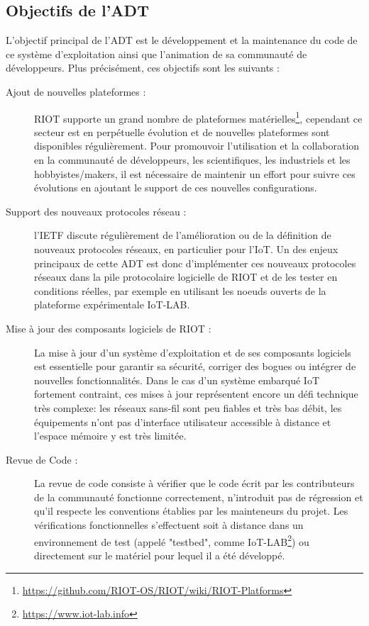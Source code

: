\documentclass[a4paper, twoside]{article}
\begin{document}
\subsection{Objectifs de l'ADT}

L'objectif principal de l'ADT est le développement et la maintenance du code de
ce système d'exploitation ainsi que l'animation de sa communauté de
développeurs.
Plus précisément, ces objectifs sont les suivants :
\begin{description}
    \item[Ajout de nouvelles plateformes :] RIOT supporte un grand nombre de
        plateformes
        matérielles\footnote{\url{https://github.com/RIOT-OS/RIOT/wiki/RIOT-Platforms}},
        cependant ce secteur est en perpétuelle évolution et de nouvelles plateformes
        sont disponibles régulièrement. Pour promouvoir l'utilisation et la 
        collaboration en la communauté de développeurs, les scientifiques, les 
        industriels et les hobbyistes/makers, il est nécessaire de maintenir un effort 
        pour suivre ces évolutions en ajoutant le support de ces nouvelles configurations.

    \item[Support des nouveaux protocoles réseau :] l'IETF discute régulièrement de
        l'amélioration ou de la définition de nouveaux protocoles réseaux, en
        particulier pour l'IoT. Un des enjeux principaux de cette ADT est donc
        d'implémenter ces nouveaux protocoles réseaux dans la pile protocolaire
        logicielle de RIOT et de les tester en conditions réelles, par exemple en
        utilisant les noeuds ouverts de la plateforme expérimentale IoT-LAB.

    \item[Mise à jour des composants logiciels de RIOT :] La mise à jour d'un système
        d'exploitation et de ses composants logiciels est essentielle pour garantir sa
        sécurité, corriger des bogues ou intégrer de nouvelles fonctionnalités. Dans le
        cas d'un système embarqué IoT fortement contraint, ces mises à jour représentent
        encore un défi technique très complexe: les réseaux sans-fil sont peu fiables et très bas débit,
        les équipements n'ont pas d'interface utilisateur accessible à distance et
        l'espace mémoire y est très limitée.

    \item[Revue de Code :] La revue de code consiste à vérifier que le code écrit par les
        contributeurs de la communauté fonctionne correctement, n'introduit pas de
        régression et qu'il respecte les conventions établies par les mainteneurs du
        projet. Les vérifications fonctionnelles s'effectuent soit à distance dans un
        environnement de test (appelé "testbed",  comme 
        IoT-LAB\footnote{\url{https://www.iot-lab.info}}) ou directement sur le matériel 
        pour lequel il a été développé.
\end{description}
\end{document}

